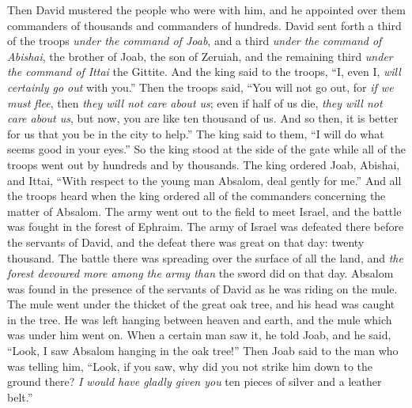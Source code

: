 \begin{biblechapter} %
 Then David mustered the people who were with him, and he appointed over them commanders of thousands and commanders of hundreds.
\verse David sent forth a third of the troops \textit{under the command of Joab}, and a third \textit{under the command of Abishai}, the brother of Joab, the son of Zeruiah, and the remaining third \textit{under the command of Ittai} the Gittite. And the king said to the troops, “I, even I, \textit{will certainly go out} with you.”
\verse Then the troops said, “You will not go out, for \textit{if we must flee}, then \textit{they will not care about us}; even if half of us die, \textit{they will not care about us}, but now, you are like ten thousand of us. And so then, it is better for us that you be in the city to help.”
\verse The king said to them, “I will do what seems good in your eyes.” So the king stood at the side of the gate while all of the troops went out by hundreds and by thousands.
\verse The king ordered Joab, Abishai, and Ittai, “With respect to the young man Absalom, deal gently for me.” And all the troops heard when the king ordered all of the commanders concerning the matter of Absalom.
\verse The army went out to the field to meet Israel, and the battle was fought in the forest of Ephraim.
\verse The army of Israel was defeated there before the servants of David, and the defeat there was great on that day: twenty thousand.
\verse The battle there was spreading over the surface of all the land, and \textit{the forest devoured more among the army than} the sword did on that day.
\verse Absalom was found in the presence of the servants of David as he was riding on the mule. The mule went under the thicket of the great oak tree, and his head was caught in the tree. He was left hanging between heaven and earth, and the mule which was under him went on.
\verse When a certain man saw it, he told Joab, and he said, “Look, I saw Absalom hanging in the oak tree!”
\verse Then Joab said to the man who was telling him, “Look, if you saw, why did you not strike him down to the ground there? \textit{I would have gladly given you} ten pieces of silver and a leather belt.”

\end{biblechapter}
